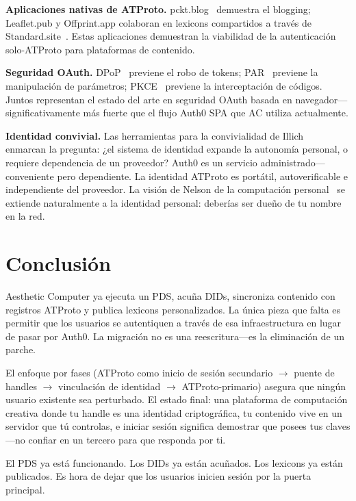 \documentclass[10pt,letterpaper,twocolumn]{article}
\begin{document}
\textbf{Aplicaciones nativas de ATProto.} pckt.blog~\citep{pcktblog2025} demuestra el blogging; Leaflet.pub y Offprint.app colaboran en lexicons compartidos a través de Standard.site~\citep{standardsite2025}. Estas aplicaciones demuestran la viabilidad de la autenticación solo-ATProto para plataformas de contenido.

\textbf{Seguridad OAuth.} DPoP~\citep{rfc9449dpop} previene el robo de tokens; PAR~\citep{rfc9126par} previene la manipulación de parámetros; PKCE~\citep{rfc7636pkce} previene la interceptación de códigos. Juntos representan el estado del arte en seguridad OAuth basada en navegador---significativamente más fuerte que el flujo Auth0 SPA que AC utiliza actualmente.

\textbf{Identidad convivial.} Las herramientas para la convivialidad de Illich~\citep{illich1973tools} enmarcan la pregunta: ¿el sistema de identidad expande la autonomía personal, o requiere dependencia de un proveedor? Auth0 es un servicio administrado---conveniente pero dependiente. La identidad ATProto es portátil, autoverificable e independiente del proveedor. La visión de Nelson de la computación personal~\citep{nelson1974computerlib} se extiende naturalmente a la identidad personal: deberías ser dueño de tu nombre en la red.


\section{Conclusión}

Aesthetic Computer ya ejecuta un PDS, acuña DIDs, sincroniza contenido con registros ATProto y publica lexicons personalizados. La única pieza que falta es permitir que los usuarios se autentiquen a través de esa infraestructura en lugar de pasar por Auth0. La migración no es una reescritura---es la eliminación de un parche.

El enfoque por fases (ATProto como inicio de sesión secundario $\to$ puente de handles $\to$ vinculación de identidad $\to$ ATProto-primario) asegura que ningún usuario existente sea perturbado. El estado final: una plataforma de computación creativa donde tu handle es una identidad criptográfica, tu contenido vive en un servidor que tú controlas, e iniciar sesión significa demostrar que posees tus claves---no confiar en un tercero para que responda por ti.

El PDS ya está funcionando. Los DIDs ya están acuñados. Los lexicons ya están publicados. Es hora de dejar que los usuarios inicien sesión por la puerta principal.
\end{document}
